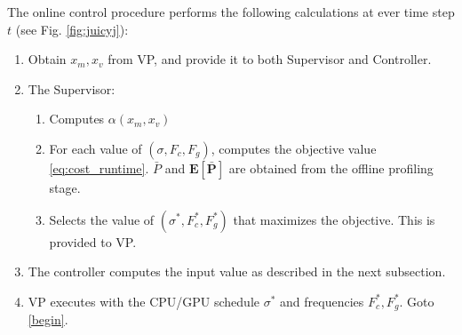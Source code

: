 %

The online control procedure performs the following calculations at ever time step $t$ (see Fig. \ref{fig:juicyj}):
\begin{enumerate}
	\item Obtain $x_m,x_v$ from VP, and provide it to both Supervisor and Controller.
	\label{begin}
	\item The Supervisor:
	\begin{enumerate}
		\item Computes $\alpha(x_m,x_v)$
		\item For each value of $(\sigma,F_c,F_g)$, computes the objective value \eqref{eq:cost_runtime}. $\bar{P}$ and $\mathbf{E[\bar{P}]}$ are obtained from the offline profiling stage.
		\item Selects the value of $(\sigma^*,F_c^*,F_g^*)$ that maximizes the objective. This is provided to VP.
	\end{enumerate}
	\item The controller computes the input value as described in the next subsection.
	\item VP executes with the CPU/GPU schedule $\sigma^*$ and frequencies $F_c^*,F_g^*$. Goto \ref{begin}.
\end{enumerate}







